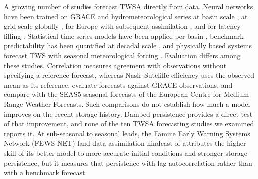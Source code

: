 \documentclass[hess, manuscript]{copernicus}
\begin{document}
A growing number of studies forecast TWSA directly from data. Neural
networks have been trained on GRACE and hydrometeorological series at basin
scale \citep{ahmed2019narx}, at grid scale globally \citep{li2020wrr,
li2024grl, li2026fcast}, for Europe with subsequent assimilation
\citep{li2025wrr}, and for latency filling \citep{mo2025nrt}. Statistical
time-series models have been applied per basin \citep{ahi2021prediction},
benchmark predictability has been quantified at decadal scale
\citep{zhu2019elasticity}, and physically based systems forecast TWS with
seasonal meteorological forcing \citep{li2026fldas, getirana2020groundwater}.
Evaluation differs among these studies. Correlation measures agreement with
observations without specifying a reference forecast, whereas
Nash--Sutcliffe efficiency uses the observed mean as its reference.
\citet{li2024grl} evaluate forecasts against GRACE observations, and
\citet{li2026fcast} compare with the SEAS5 seasonal forecasts of the
European Centre for Medium-Range Weather Forecasts. Such comparisons do not establish
how much a model improves on the recent storage history. Damped
persistence provides a direct test of that improvement, and none of the
ten TWSA forecasting studies we examined reports it.
At sub-seasonal to seasonal leads, the Famine Early Warning Systems
Network (FEWS NET) land data assimilation hindcast of \citet{li2026fldas}
attributes the higher skill of its better model to more accurate initial
conditions and stronger storage persistence, but it measures that
persistence with lag autocorrelation rather than with a benchmark forecast.
\end{document}
